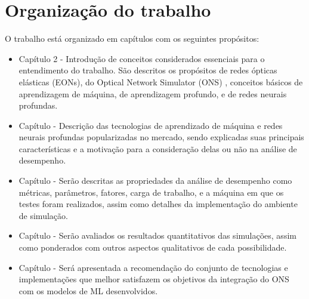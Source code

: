 \section{Organização do trabalho}
\label{intro-org}

O trabalho está organizado em \todo[?] capítulos com os seguintes propósitos:

\begin{itemize}
  \item Capítulo 2 - Introdução de conceitos considerados essenciais para o entendimento do trabalho. São descritos os propósitos de redes ópticas elásticas (EONs), do Optical Network Simulator (ONS) \cite{costa2016ons}, conceitos básicos de aprendizagem de máquina, de aprendizagem profundo, e de redes neurais profundas.

  \item Capítulo \todo[?] - Descrição das tecnologias de aprendizado de máquina e redes neurais profundas popularizadas no mercado, sendo explicadas suas principais características e a motivação para a consideração delas ou não na análise de desempenho.

  \item Capítulo \todo[análise] - Serão descritas as propriedades da análise de desempenho como métricas, parâmetros, fatores, carga de trabalho, e a máquina em que os testes foram realizados, assim como detalhes da implementação do ambiente de simulação.

  \item Capítulo \todo[resultados] - Serão avaliados os resultados quantitativos das simulações, assim como ponderados com outros aspectos qualitativos de cada possibilidade.

  \item Capítulo \todo[conclusão] - Será apresentada a recomendação do conjunto de tecnologias e implementações que melhor satisfazem os objetivos da integração do ONS com os modelos de ML desenvolvidos.
\end{itemize}






